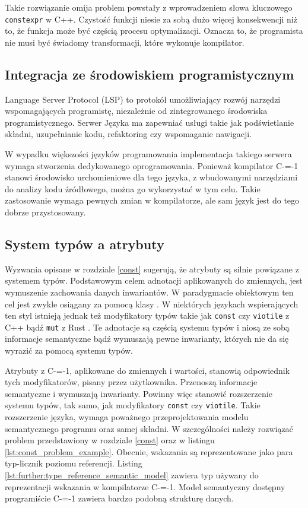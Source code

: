 Takie rozwiązanie omija problem powstały z wprowadzeniem słowa kluczowego \lstinline{constexpr} w C++\cite{Klimiankou:contexpr_great_good_wrong_idea}.
Czystość funkcji niesie za sobą dużo więcej konsekwencji niż to, że funkcja może być częścią procesu optymalizacji.
Oznacza to, że programista nie musi być świadomy transformacji, które wykonuje kompilator.

\subsection{Integracja ze środowiskiem programistycznym}
\label{IDE_integration}

Language Server Protocol (LSP) \cite{bunder2019decoupling_lsp} to protokół umożliwiający rozwój narzędzi wspomagających programistę, niezależnie od zintegrowanego środowiska programistycznego.
Serwer Języka ma zapewniać usługi takie jak podświetlanie składni, uzupełnianie kodu, refaktoring czy wspomaganie nawigacji.

W wypadku większości języków programowania implementacja takiego serwera wymaga stworzenia dedykowanego oprogramowania.
Ponieważ kompilator C-=-1 stanowi środowisko urchomieniowe dla tego języka, z wbudowanymi narzędziami do analizy kodu źródłowego, można go wykorzystać w tym celu.
Takie zastosowanie wymaga pewnych zmian w kompilatorze, ale sam język jest do tego dobrze przystosowany.

\subsection{System typów a atrybuty}
\label{further:adnotated_type_system}

Wyzwania opisane w rozdziale \ref{const} sugerują, że atrybuty są silnie powiązane z systemem typów.
Podstawowym celem adnotacji aplikowanych do zmiennych, jest wymuszenie zachowania danych inwariantów.
W paradygmacie obiektowym ten cel jest zwykle osiągany za pomocą klasy \cite{oop_paradignm}.
W niektórych językach wspierających ten styl istnieją jednak też modyfikatory typów takie jak \lstinline{const} czy \lstinline{viotile} z C++ bądź \lstinline{mut} z Rust \cite{klabnik2019rust}.
Te adnotacje są częścią systemu typów i niosą ze sobą informacje semantyczne bądź wymuszają pewne inwarianty, których nie da się wyrazić za pomocą systemu typów.

Atrybuty z C-=-1, aplikowane do zmiennych i wartości, stanowią odpowiednik tych modyfikatorów, pisany przez użytkownika.
Przenoszą informacje semantyczne i wymuszają inwarianty.
Powinny więc stanowić rozszerzenie systemu typów, tak samo, jak modyfikatory \lstinline{const} czy \lstinline{viotile}.
Takie rozszerzenie języka, wymaga poważnego przeprojektowania modelu semantycznego programu oraz samej składni.
W szczególności należy rozwiązać problem przedstawiony w rozdziale \ref{const} oraz w listingu \ref{lst:const_problem_example}.
Obecnie, wskazania są reprezentowane jako para typ-licznik poziomu referencji.
Listing \ref{lst:further:type_reference_semantic_model} zawiera typ używany do reprezentacji wskazania w kompilatorze C-=-1.
Model semantyczny dostępny programiście C-=-1 zawiera bardzo podobną strukturę danych.

